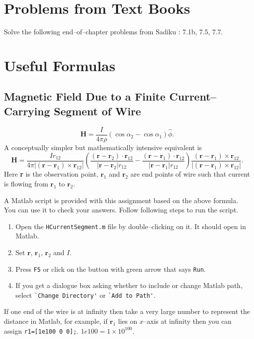 \documentclass[12pt,a4paper]{article}
\begin{document}
\section{Problems from Text Books}
Solve the following end--of--chapter problems from Sadiku \cite[Ch. 7, pg. 296--297]{Sadiku}: 7.1b, 7.5, 7.7.
\section{Useful Formulas}
\subsection{Magnetic Field Due to a Finite Current--Carrying Segment of Wire}
\begin{equation}
\textbf{H}=\dfrac{I}{4\pi\rho}(\cos\alpha_2-\cos\alpha_1)\hat\phi.
\end{equation}
A conceptually simpler but mathematically intensive equivalent is
\begin{equation}
\textbf{H}=\dfrac{Ir_{12}}{4\pi|(\textbf{r}-\textbf{r}_1)\times\textbf{r}_{12}|}\left(\dfrac{(\textbf{r}-\textbf{r}_2)\cdot\textbf{r}_{12}}{|\textbf{r}-\textbf{r}_2|r_{12}}-\dfrac{(\textbf{r}-\textbf{r}_1)\cdot\textbf{r}_{12}}{|\textbf{r}-\textbf{r}_1|r_{12}}\right)\dfrac{(\textbf{r}-\textbf{r}_1)\times\textbf{r}_{12}}{|(\textbf{r}-\textbf{r}_1)\times \textbf{r}_{12}|}.
\end{equation}
Here \textbf{r} is the observation point, $\textbf{r}_1$ and $\textbf{r}_2$ are end points of wire such that current is flowing from $\textbf{r}_1$ to $\textbf{r}_2$.

A Matlab script is provided with this assignment based on the above formula. You can use it to check your answers. Follow following steps to run the script.
\begin{enumerate}
\item Open the \verb|HCurrentSegment.m| file by double--clicking on it. It should open in Matlab.
\item Set $\textbf{r}$, $\textbf{r}_1$, $\textbf{r}_2$ and $I$.
\item Press \verb|F5| or click on the button with green arrow that says \verb|Run|.
\item If you get a dialogue box asking whether to include or change Matlab path, select \verb|`Change Directory'| or \verb|`Add to Path'|.
\end{enumerate}

If one end of the wire is at infinity then take a very large number to represent the distance in Matlab, for example, if $\textbf{r}_1$ lies on $x$--axis at infinity then you can assign \verb|r1=[1e100 0 0];|. $1e100=1\times 10^{100}$.
\end{document}
